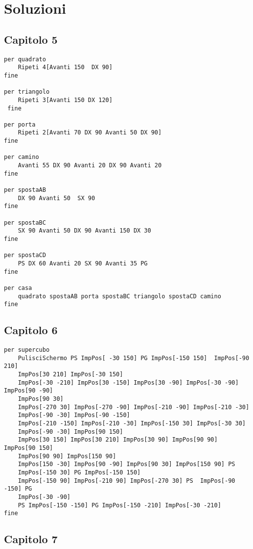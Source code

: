 \chapter{Soluzioni}

\section{Capitolo 5}
\begin{lstlisting}
per quadrato
	Ripeti 4[Avanti 150  DX 90]
fine

per triangolo
	Ripeti 3[Avanti 150 DX 120]
 fine

per porta
	Ripeti 2[Avanti 70 DX 90 Avanti 50 DX 90]
fine

per camino
	Avanti 55 DX 90 Avanti 20 DX 90 Avanti 20
fine

per spostaAB
	DX 90 Avanti 50  SX 90
fine

per spostaBC
	SX 90 Avanti 50 DX 90 Avanti 150 DX 30
fine

per spostaCD
	PS DX 60 Avanti 20 SX 90 Avanti 35 PG
fine

per casa
	quadrato spostaAB porta spostaBC triangolo spostaCD camino
fine
\end{lstlisting}

\section{Capitolo 6}
\begin{lstlisting}
per supercubo
	PulisciSchermo PS ImpPos[ -30 150] PG ImpPos[-150 150]  ImpPos[-90 210] 
	ImpPos[30 210] ImpPos[-30 150]
	ImpPos[-30 -210] ImpPos[30 -150] ImpPos[30 -90] ImpPos[-30 -90] ImpPos[90 -90] 
	ImpPos[90 30]  
	ImpPos[-270 30] ImpPos[-270 -90] ImpPos[-210 -90] ImpPos[-210 -30]
	ImpPos[-90 -30] ImpPos[-90 -150]
	ImpPos[-210 -150] ImpPos[-210 -30] ImpPos[-150 30] ImpPos[-30 30]
	ImpPos[-90 -30] ImpPos[90 150]
	ImpPos[30 150] ImpPos[30 210] ImpPos[30 90] ImpPos[90 90] ImpPos[90 150]
	ImpPos[90 90] ImpPos[150 90]
	ImpPos[150 -30] ImpPos[90 -90] ImpPos[90 30] ImpPos[150 90] PS 
	ImpPos[-150 30] PG ImpPos[-150 150] 
	ImpPos[-150 90] ImpPos[-210 90] ImpPos[-270 30] PS  ImpPos[-90 -150] PG
	ImpPos[-30 -90]
	PS ImpPos[-150 -150] PG ImpPos[-150 -210] ImpPos[-30 -210]
fine
\end{lstlisting}

\section{Capitolo 7}
